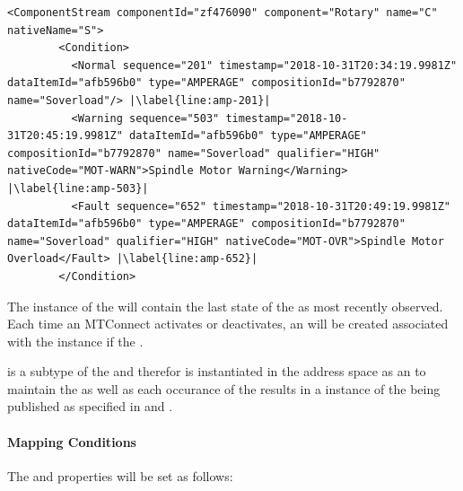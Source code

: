 \begin{lstlisting}[firstnumber=last,escapechar=|,%
    caption={Rotary C Component Stream},label={lst:rotary-component-stream}]
      <ComponentStream componentId="zf476090" component="Rotary" name="C" nativeName="S">
        <Condition>
          <Normal sequence="201" timestamp="2018-10-31T20:34:19.9981Z" dataItemId="afb596b0" type="AMPERAGE" compositionId="b7792870" name="Soverload"/> |\label{line:amp-201}|
          <Warning sequence="503" timestamp="2018-10-31T20:45:19.9981Z" dataItemId="afb596b0" type="AMPERAGE" compositionId="b7792870" name="Soverload" qualifier="HIGH" nativeCode="MOT-WARN">Spindle Motor Warning</Warning> |\label{line:amp-503}|
          <Fault sequence="652" timestamp="2018-10-31T20:49:19.9981Z" dataItemId="afb596b0" type="AMPERAGE" compositionId="b7792870" name="Soverload" qualifier="HIGH" nativeCode="MOT-OVR">Spindle Motor Overload</Fault> |\label{line:amp-652}|
        </Condition>
\end{lstlisting}

The instance of the  will contain the last state of the  as most recently observed. Each time an MTConnect  activates or deactivates, an   will be created associated with the instance if the  . 

 is a subtype of the  and therefor is instantiated in the address space as an  to maintain the  as well as each occurance of the  results in a instance of the  being published as specified in \cite{UAPart3} and \cite{UAPart9}.

\paragraph{Mapping Conditions}

The  and  properties will be set as follows:

